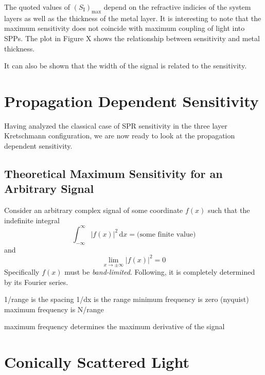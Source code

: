 \documentclass[a4paper,titlepage,onecolumn]{report}
\newcommand{\md}{\,\mathrm{d}}
\begin{document}
The quoted values of $(S_{\mathrm{I}})_{\text{max}}$ depend on the
refractive indicies of the system layers as well as the thickness
of the metal layer. It is interesting to note that the maximum sensitivity
does not coincide with maximum coupling of light into SPPs. The plot
in Figure X shows the relationship between sensitivity and metal thickness.

It can also be shown that the width of the signal is related to the
sensitivity. 


\section{Propagation Dependent Sensitivity}

Having analyzed the classical case of SPR sensitivity in the three
layer Kretschmann configuration, we are now ready to look at the propagation
dependent sensitivity. 


\subsection{Theoretical Maximum Sensitivity for an Arbitrary Signal}

Consider an arbitrary complex signal of some coordinate $f(x)$ such
that the indefinite integral
\begin{equation}
\int_{-\infty}^{\infty}|f(x)|^{2}\md x=\text{(some finite value)}
\end{equation}
 and
\begin{equation}
\lim_{x\to\pm\infty}|f(x)|^{2}=0
\end{equation}
Specifically $f(x)$ must be \textit{band-limited}. Following, it is
completely determined by its Fourier series.

1/range is the spacing
1/dx is the range
minimum frequency is zero (nyquist)
maximum frequency is N/range

maximum frequency determines the maximum derivative of the signal


% 



\section{Conically Scattered Light}
\end{document}
